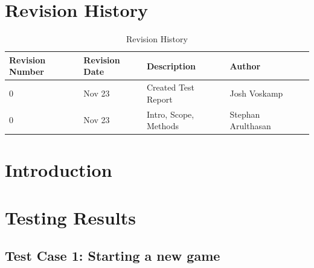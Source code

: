 \documentclass[12pt]{article}
\begin{document}
\begin{titlepage}



\vfill %

\end{titlepage}

\newpage
\tableofcontents
\newpage
\listoftables
{}
\newpage
\listoffigures
{}
\newpage

\section*{Revision History}
\begin{table}[!htbp]
	\centering
    \begin{tabular}{ | p{2cm} | l| l | l |p{3cm}|}
    \hline
    Revision Number & Revision Date & Description & Author \\ \hline
    0 & Nov 23 & Created Test Report & Josh Voskamp \\ \hline
	0 & Nov 23 & Intro, Scope, Methods & Stephan Arulthasan\\ \hline
    \end{tabular}
    \caption{Revision History}
\end{table}

\newpage

\section{Introduction}

\section{Testing Results}

\subsection{Test Case 1: Starting a new game}
\end{document}
